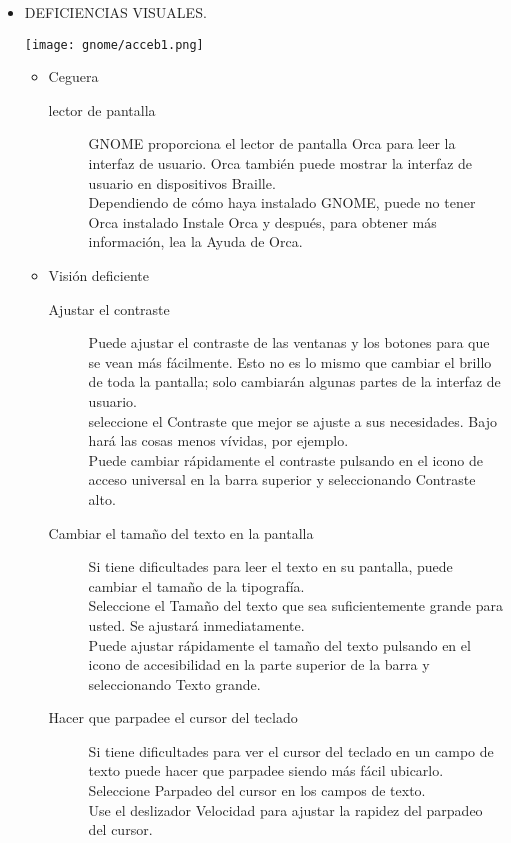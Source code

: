 \begin{itemize}
\item DEFICIENCIAS VISUALES.
\begin{center}
\texttt{[image: gnome/acceb1.png]} 
\end{center}
\begin{itemize}
\item Ceguera
\begin{description}
\item[lector de pantalla] GNOME proporciona el lector de pantalla Orca para leer la interfaz de usuario. Orca también puede mostrar la interfaz de usuario en dispositivos Braille.\\
Dependiendo de cómo haya instalado GNOME, puede no tener Orca instalado Instale Orca y después, para obtener más información, lea la Ayuda de Orca.
\end{description}
\item Visión deficiente
   \begin{description}
  	\item[Ajustar el contraste] Puede ajustar el contraste de las ventanas y los botones 		para que se vean más fácilmente. Esto no es lo mismo que cambiar el brillo de 				toda la pantalla; solo cambiarán algunas partes de la interfaz de usuario.\\
seleccione el Contraste que mejor se ajuste a sus necesidades. Bajo hará las cosas menos vívidas, por ejemplo.\\
Puede cambiar rápidamente el contraste pulsando en el icono de acceso universal en la barra superior y seleccionando Contraste alto.
  	\item[Cambiar el tamaño del texto en la pantalla] Si tiene dificultades para leer el texto en su pantalla, puede cambiar el tamaño de la tipografía.\\
Seleccione el Tamaño del texto que sea suficientemente grande para usted. Se ajustará inmediatamente.\\
Puede ajustar rápidamente el tamaño del texto pulsando en el icono de accesibilidad en la parte superior de la barra y seleccionando Texto grande.
	\item[Hacer que parpadee el cursor del teclado ] Si tiene dificultades para ver el cursor del teclado en un campo de texto puede hacer que parpadee siendo más fácil ubicarlo.\\
Seleccione Parpadeo del cursor en los campos de texto.\\
Use el deslizador Velocidad para ajustar la rapidez del parpadeo del cursor.

\end{description}
\end{itemize}
\end{itemize}
